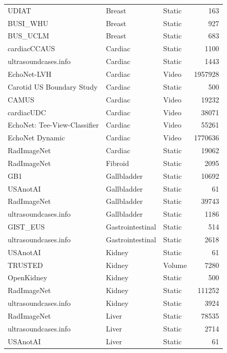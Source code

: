 \documentclass{article}
\theoremstyle{plain}
\theoremstyle{definition}
\theoremstyle{remark}
\begin{document}
\begin{small}
\begin{center}
\begin{sc}
\begin{longtable}{lllr}
UDIAT \cite{yap_automated_2018} & Breast & Static & 163 \\
BUSI\_WHU \cite{huang_busi_whu_2023} & Breast & Static & 927 \\
BUS\_UCLM \cite{vallez_bus-uclm_2024} & Breast & Static & 683 \\
cardiacCCAUS \cite{agata_momot_common_2022} & Cardiac & Static & 1100 \\
ultrasoundcases.info & Cardiac & Static & 1443 \\
EchoNet-LVH \cite{duffy_high-throughput_2022} & Cardiac & Video & 1957928 \\
Carotid US Boundary Study \cite{kristen_meiburger_dataset_2022} & Cardiac & Static & 500 \\
CAMUS \cite{leclerc_deep_2019} & Cardiac & Video & 19232 \\
cardiacUDC \cite{yang_graphecho_2023} & Cardiac & Video & 38071 \\
EchoNet: Tee-View-Classifier \cite{steffner_deep_2024} & Cardiac & Video & 55261 \\
EchoNet Dynamic \cite{ouyang_echonet-dynamic_nodate} & Cardiac & Video & 1770636 \\
RadImageNet & Cardiac & Static & 19062 \\
RadImageNet & Fibroid & Static & 2095 \\
GB1 \cite{turki_gallblader_2025} & Gallbladder & Static & 10692 \\
USAnotAI & Gallbladder & Static & 61 \\
RadImageNet & Gallbladder & Static & 39743 \\
ultrasoundcases.info & Gallbladder & Static & 1186 \\
GIST\_EUS \cite{he_query2mathmsup_2023} & Gastrointestinal & Static & 514 \\
ultrasoundcases.info & Gastrointestinal & Static & 2618 \\
USAnotAI & Kidney & Static & 61 \\
TRUSTED \cite{ndzimbong_trusted_2025} & Kidney & Volume & 7280 \\
OpenKidney \cite{singla_open_2022} & Kidney & Static & 500 \\
RadImageNet & Kidney & Static & 111252 \\
ultrasoundcases.info & Kidney & Static & 3924 \\
RadImageNet & Liver & Static & 78535 \\
ultrasoundcases.info & Liver & Static & 2714 \\
USAnotAI & Liver & Static & 61 \\

\end{longtable}
\end{sc}
\end{center}
\end{small}
\end{document}
